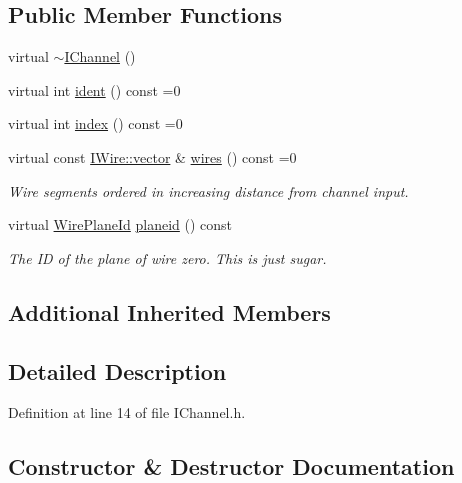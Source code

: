 \subsection*{Public Member Functions}
\begin{DoxyCompactItemize}
\item 
virtual \hyperlink{class_wire_cell_1_1_i_channel_a1954d6f43b7917ff4cad314eaa0acc6f}{$\sim$\+I\+Channel} ()
\item 
virtual int \hyperlink{class_wire_cell_1_1_i_channel_a402dc3c45e1827f7437b7db059a834b1}{ident} () const =0
\item 
virtual int \hyperlink{class_wire_cell_1_1_i_channel_a778ee7c6f6b69febe03862b4e2ae2a43}{index} () const =0
\item 
virtual const \hyperlink{class_wire_cell_1_1_i_data_ae1a9f863380499bb43f39fabb6276660}{I\+Wire\+::vector} \& \hyperlink{class_wire_cell_1_1_i_channel_a699d41be0c4e79f99dfef3b69394cf52}{wires} () const =0
\begin{DoxyCompactList}\small\item\em Wire segments ordered in increasing distance from channel input. \end{DoxyCompactList}\item 
virtual \hyperlink{class_wire_cell_1_1_wire_plane_id}{Wire\+Plane\+Id} \hyperlink{class_wire_cell_1_1_i_channel_abfb090d07e74573c9cf633695ca73927}{planeid} () const
\begin{DoxyCompactList}\small\item\em The ID of the plane of wire zero. This is just sugar. \end{DoxyCompactList}\end{DoxyCompactItemize}
\subsection*{Additional Inherited Members}


\subsection{Detailed Description}


Definition at line 14 of file I\+Channel.\+h.



\subsection{Constructor \& Destructor Documentation}
\mbox{\label{class_wire_cell_1_1_i_channel_a1954d6f43b7917ff4cad314eaa0acc6f}} 
